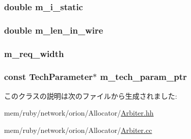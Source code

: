 \hypertarget{classArbiter_a16f0c9e5942378eab4d83da3c61aba7f}{
\subsubsection[{m\_\-i\_\-static}]{\setlength{\rightskip}{0pt plus 5cm}double {\bf m\_\-i\_\-static}}}
\label{classArbiter_a16f0c9e5942378eab4d83da3c61aba7f}
\hypertarget{classArbiter_aff2fda531349c91521ef8a9ae4fdabb7}{
\subsubsection[{m\_\-len\_\-in\_\-wire}]{\setlength{\rightskip}{0pt plus 5cm}double {\bf m\_\-len\_\-in\_\-wire}}}
\label{classArbiter_aff2fda531349c91521ef8a9ae4fdabb7}
\hypertarget{classArbiter_ab685e23a6185c3ad52cd5184aa3dbb01}{
\subsubsection[{m\_\-req\_\-width}]{ {\bf m\_\-req\_\-width}}}
\label{classArbiter_ab685e23a6185c3ad52cd5184aa3dbb01}
\hypertarget{classArbiter_a11d1644aa2bfe0e16783dface6fadf13}{
\subsubsection[{m\_\-tech\_\-param\_\-ptr}]{\setlength{\rightskip}{0pt plus 5cm}const {\bf TechParameter}$\ast$ {\bf m\_\-tech\_\-param\_\-ptr}}}
\label{classArbiter_a11d1644aa2bfe0e16783dface6fadf13}


このクラスの説明は次のファイルから生成されました:\begin{DoxyCompactItemize}
\item 
mem/ruby/network/orion/Allocator/\hyperlink{Arbiter_8hh}{Arbiter.hh}\item 
mem/ruby/network/orion/Allocator/\hyperlink{Arbiter_8cc}{Arbiter.cc}\end{DoxyCompactItemize}
